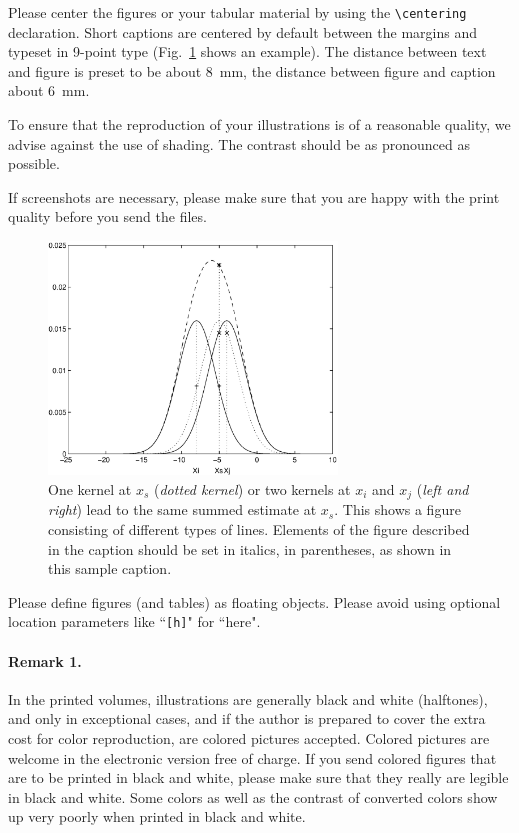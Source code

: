 \documentclass[lnicst,sechang,a4paper]{svmultln}
\begin{document}
Please center the figures or your tabular material by using the \verb+\centering+
declaration. Short captions are centered by default between the margins
and typeset in 9-point type (Fig.~\ref{fig:example} shows an example).
The distance between text and figure is preset to be about 8~mm, the
distance between figure and caption about 6~mm.

To ensure that the reproduction of your illustrations is of a reasonable
quality, we advise against the use of shading. The contrast should be as
pronounced as possible.

If screenshots are necessary, please make sure that you are happy with
the print quality before you send the files.
\begin{figure}
\centering
\includegraphics[height=6.2cm]{eijkel2}
\caption{One kernel at $x_s$ (\emph{dotted kernel}) or two kernels at
$x_i$ and $x_j$ (\textit{left and right}) lead to the same summed estimate
at $x_s$. This shows a figure consisting of different types of
lines. Elements of the figure described in the caption should be set in
italics, in parentheses, as shown in this sample caption.}
\label{fig:example}
\end{figure}

Please define figures (and tables) as floating objects. Please avoid
using optional location parameters like ``\verb+[h]+" for ``here".

\paragraph{Remark 1.}

In the printed volumes, illustrations are generally black and white
(halftones), and only in exceptional cases, and if the author is
prepared to cover the extra cost for color reproduction, are colored
pictures accepted. Colored pictures are welcome in the electronic
version free of charge. If you send colored figures that are to be
printed in black and white, please make sure that they really are
legible in black and white. Some colors as well as the contrast of
converted colors show up very poorly when printed in black and white.
\end{document}
